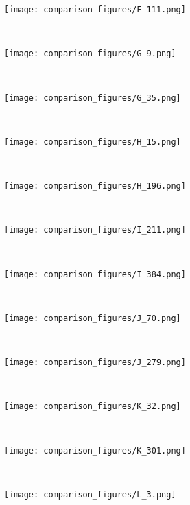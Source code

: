\documentclass[conference]{IEEEtran}
\begin{document}
\begin{figure*}[!htbp]
\begin{subfigure}[b]{0.15\textwidth}
        \texttt{[image: comparison\_figures/F\_111.png]}
    \end{subfigure}
    ~
    \begin{subfigure}[b]{0.15\textwidth}
        \texttt{[image: comparison\_figures/G\_9.png]}
    \end{subfigure}
    ~
    \begin{subfigure}[b]{0.15\textwidth}
        \texttt{[image: comparison\_figures/G\_35.png]}
    \end{subfigure}
    ~
    \begin{subfigure}[b]{0.15\textwidth}
        \texttt{[image: comparison\_figures/H\_15.png]}
    \end{subfigure}
    ~
    \begin{subfigure}[b]{0.15\textwidth}
        \texttt{[image: comparison\_figures/H\_196.png]}
    \end{subfigure}
    ~
    \begin{subfigure}[b]{0.15\textwidth}
        \texttt{[image: comparison\_figures/I\_211.png]}
    \end{subfigure}
    ~
    \begin{subfigure}[b]{0.15\textwidth}
        \texttt{[image: comparison\_figures/I\_384.png]}
    \end{subfigure}
    ~
    \begin{subfigure}[b]{0.15\textwidth}
        \texttt{[image: comparison\_figures/J\_70.png]}
    \end{subfigure}
    ~
    \begin{subfigure}[b]{0.15\textwidth}
        \texttt{[image: comparison\_figures/J\_279.png]}
    \end{subfigure}
    ~
    \begin{subfigure}[b]{0.15\textwidth}
        \texttt{[image: comparison\_figures/K\_32.png]}
    \end{subfigure}
    ~
    \begin{subfigure}[b]{0.15\textwidth}
        \texttt{[image: comparison\_figures/K\_301.png]}
    \end{subfigure}
    ~
    \begin{subfigure}[b]{0.15\textwidth}
        \texttt{[image: comparison\_figures/L\_3.png]}
    \end{subfigure}
    ~
    \begin{subfigure}[b]{0.15\textwidth}

\end{subfigure}
\end{figure*}
\end{document}
